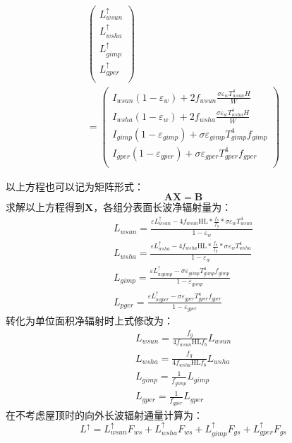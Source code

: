 \begin{landscape}
\begin{equation}
\begin{aligned}
\left(\begin{matrix}L_{wsun}^\uparrow\\L_{wsha}^\uparrow\\L_{gimp}^\uparrow\\L_{gper}^\uparrow\\\end{matrix}\right)\\
=\left(\begin{matrix}I_{wsun}\left(1-\varepsilon_w\right)+2f_{wsun}\frac{\sigma\varepsilon_wT_{wsun}^4H}{W}\\I_{wsha}\left(1-\varepsilon_w\right)+2f_{wsha}\frac{\sigma\varepsilon_wT_{wsha}^4H}{W}\\I_{gimp}\left(1-\varepsilon_{gimp}\right)+\sigma\varepsilon_{gimp}T_{gimp}^4f_{gimp}\\I_{gper}\left(1-\varepsilon_{gper}\right)+\sigma\varepsilon_{gper}T_{gper}^4f_{gper}\\\end{matrix}\right)
\end{aligned}
\end{equation}
\end{landscape}

以上方程也可以记为矩阵形式：
\begin{equation}
\mathbf{A X}=\mathbf{B}
\end{equation}
求解以上方程得到$\mathbf{X}$，各组分表面长波净辐射量为：
\begin{equation}\label{L_wsun_wsha_gimp_pger_1}
\begin{array}{c}L_{wsun}=\frac{\varepsilon L_{wsun}^{\uparrow}-4 f_{wsun} \mathrm{HL} * \frac{f_{b}}{f_{g}} * \sigma \varepsilon_{w} T_{wsun}^{4}}{1-\varepsilon_{w}} \\ L_{wsha}=\frac{\varepsilon L_{wsha}^{\uparrow}-4 f_{wsha} \mathrm{HL} * \frac{f_{b}}{f_{g}} * \sigma \varepsilon_{w} T_{wsha}^{4}}{1-\varepsilon_{w}} \\ L_{gimp}=\frac{\varepsilon L_{w gimp}^{\uparrow}-\sigma \varepsilon_{gimp} T_{gimp}^{4} f_{gimp}}{1-\varepsilon_{gimp}} \\ L_{p g e r}=\frac{\varepsilon L_{w gper}^{\uparrow}-\sigma \varepsilon_{gper} T_{gper}^{4} f_{gper}}{1-\varepsilon_{gper}}\end{array}
\end{equation}
转化为单位面积净辐射时上式修改为：
\begin{equation}\label{L_wsun_wsha_gimp_pger_2}
\begin{array}{c}L_{wsun}=\frac{f_{g}}{4 f_{wsun} \mathrm{HL} f_{b}} L_{wsun} \\ L_{wsha}=\frac{f_{g}}{4 f_{wsha} \mathrm{HL} f_{b}} L_{wsha} \\ L_{gimp}=\frac{1}{f_{gimp}} L_{gimp} \\ L_{gper}=\frac{1}{f_{gper}} L_{gper}\end{array}
\end{equation}
在不考虑屋顶时的向外长波辐射通量计算为：
\begin{equation}
L^{\uparrow}=L_{wsun}^{\uparrow} F_{ws}+L_{wsha}^{\uparrow} F_{ws}+L_{gimp}^{\uparrow} F_{gs}+L_{gper}^{\uparrow} F_{gs}
\end{equation}


